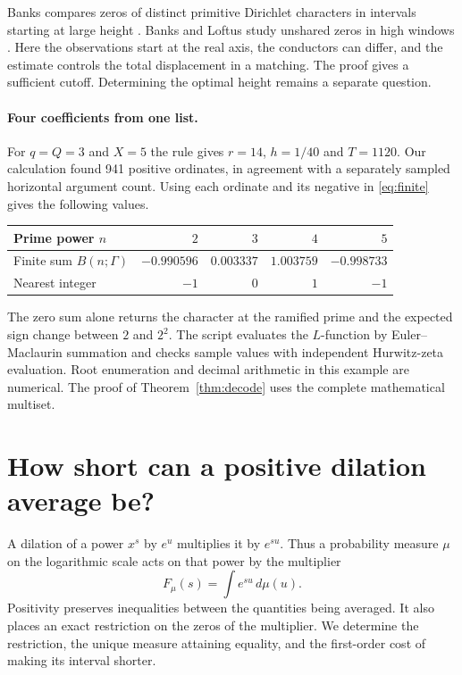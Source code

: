 \documentclass[11pt,letterpaper]{article}
\theoremstyle{remark}\newtheorem{remark}[theorem]{Remark}
\begin{document}
Banks compares zeros of distinct primitive Dirichlet characters in intervals starting at large height \cite{banks}. Banks and Loftus study unshared zeros in high windows \cite{loftus}. Here the observations start at the real axis, the conductors can differ, and the estimate controls the total displacement in a matching. The proof gives a sufficient cutoff. Determining the optimal height remains a separate question.

\paragraph{Four coefficients from one list.}
For $q=Q=3$ and $X=5$ the rule gives $r=14$, $h=1/40$ and $T=1120$. Our calculation found 941 positive ordinates, in agreement with a separately sampled horizontal argument count. Using each ordinate and its negative in \eqref{eq:finite} gives the following values.
\begin{center}
\begin{tabular}{lrrrr}\toprule
Prime power $n$ & $2$ & $3$ & $4$ & $5$ \\
\midrule
Finite sum $B(n;\Gamma)$ & $-0.990596$ & $0.003337$ & $1.003759$ & $-0.998733$\\
Nearest integer & $-1$ & $0$ & $1$ & $-1$\\
\bottomrule\end{tabular}
\end{center}
The zero sum alone returns the character at the ramified prime and the expected sign change between $2$ and $2^2$. The script evaluates the $L$-function by Euler--Maclaurin summation and checks sample values with independent Hurwitz-zeta evaluation. Root enumeration and decimal arithmetic in this example are numerical. The proof of Theorem~\ref{thm:decode} uses the complete mathematical multiset.


\section{How short can a positive dilation average be?}\label{sec:filters}

A dilation of a power $x^s$ by $e^u$ multiplies it by $e^{su}$. Thus a probability measure $\mu$ on the logarithmic scale acts on that power by the multiplier
\[
 F_\mu(s)=\int e^{su}\,d\mu(u).
\]
Positivity preserves inequalities between the quantities being averaged. It also places an exact restriction on the zeros of the multiplier. We determine the restriction, the unique measure attaining equality, and the first-order cost of making its interval shorter.
\end{document}
